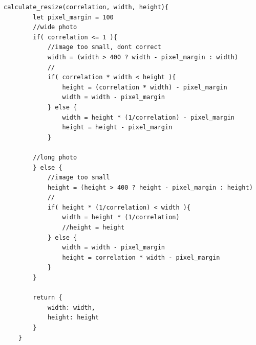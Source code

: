 \begin{lstlisting}[caption={Método para calcular el tamaño del lienzo a partir de una imagen}]
  calculate_resize(correlation, width, height){
        let pixel_margin = 100
        //wide photo
        if( correlation <= 1 ){
            //image too small, dont correct
            width = (width > 400 ? width - pixel_margin : width)
            //
            if( correlation * width < height ){
                height = (correlation * width) - pixel_margin
                width = width - pixel_margin
            } else {
                width = height * (1/correlation) - pixel_margin
                height = height - pixel_margin
            }

        //long photo
        } else {
            //image too small
            height = (height > 400 ? height - pixel_margin : height)
            //
            if( height * (1/correlation) < width ){
                width = height * (1/correlation)
                //height = height
            } else {
                width = width - pixel_margin
                height = correlation * width - pixel_margin
            }
        }

        return {
            width: width,
            height: height
        }
    }
\end{lstlisting}

\newpage
